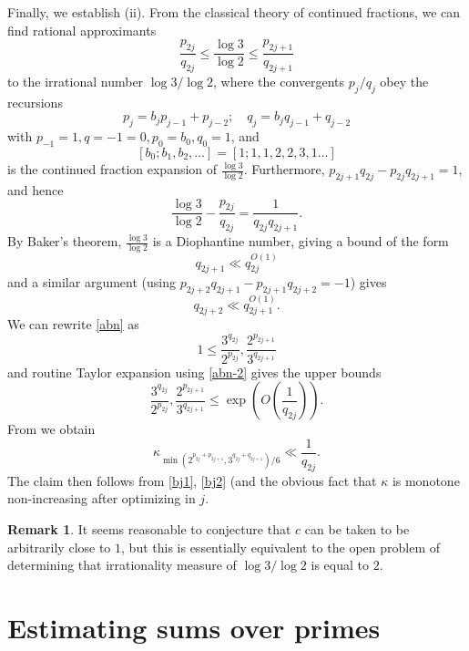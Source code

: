 \documentclass[12pt,a4paper,reqno]{amsart}
\numberwithin{equation}{section}
\theoremstyle{plain}
\theoremstyle{definition}
\newtheorem{remark}[theorem]{Remark}
\begin{document}
Finally, we establish (ii).  From the classical theory of continued fractions, we can find rational approximants
\begin{equation}\label{abn}
 \frac{p_{2j}}{q_{2j}} \leq \frac{\log 3}{\log 2} \leq \frac{p_{2j+1}}{q_{2j+1}}
\end{equation}
to the irrational number $\log 3/\log 2$, where the convergents $p_j/q_j$ obey the recursions
$$ p_j = b_j p_{j-1} + p_{j-2}; \quad q_j = b_j q_{j-1} + q_{j-2}$$
with $p_{-1} = 1, q={-1}=0, p_0 = b_0, q_0=1$, and 
$$[b_0;b_1,b_2,\dots] = [1;1,1,2,2,3,1\dots]$$ 
is the continued fraction expansion of $\frac{\log 3}{\log 2}$.  Furthermore, $p_{2j+1}q_{2j} - p_{2j} q_{2j+1} = 1$, and hence
\begin{equation}\label{abn-2} 
  \frac{\log 3}{\log 2} - \frac{p_{2j}}{q_{2j}} = \frac{1}{q_{2j} q_{2j+1}}.
\end{equation}
By Baker's theorem, $\frac{\log 3}{\log 2}$ is a Diophantine number, giving a bound of the form
\begin{equation}\label{bj1}
   q_{2j+1} \ll q_{2j}^{O(1)}
\end{equation}
and a similar argument (using $p_{2j+2} q_{2j+1}-p_{2j+1} q_{2j+2} = -1$) gives
\begin{equation}\label{bj2}
 q_{2j+2} \ll q_{2j+1}^{O(1)}.
\end{equation}
We can rewrite \eqref{abn} as
$$ 1 \leq \frac{3^{q_{2j}}}{2^{p_{2j}}}, \frac{2^{p_{2j+1}}}{3^{q_{2j+1}}}$$
and routine Taylor expansion using \eqref{abn-2} gives the upper bounds
$$ \frac{3^{q_{2j}}}{2^{p_{2j}}}, \frac{2^{p_{2j+1}}}{3^{q_{2j+1}}}\leq \exp\left( O\left( \frac{1}{q_{2j}}\right)\right).$$
From  we obtain
$$
\kappa_{\min(2^{p_{2j} + p_{2j+1}}, 3^{q_{2j}+q_{2j+1}})/6} \ll \frac{1}{q_{2j}}.$$
The claim then follows from \eqref{bj1}, \eqref{bj2} (and the obvious fact that $\kappa$ is monotone non-increasing after optimizing in $j$.

\begin{remark}
It seems reasonable to conjecture that $c$ can be taken to be arbitrarily close to $1$, but this is essentially equivalent to the open problem of determining that irrationality measure of $\log 3 / \log 2$ is equal to $2$.
\end{remark}



\section{Estimating sums over primes}\label{primes-sec}
\end{document}
